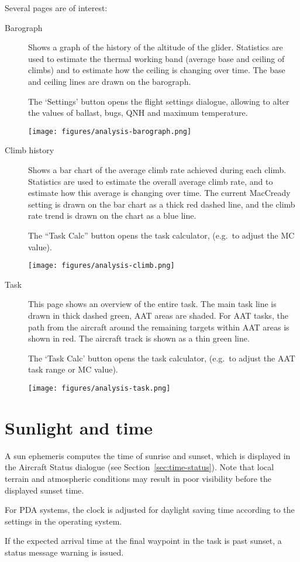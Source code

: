 Several pages are of interest:
\begin{description}
\item[Barograph]  Shows a graph of the history of the altitude of the glider.
  Statistics are used to estimate the thermal working band (average
  base and ceiling of climbs) and to estimate how the ceiling is
  changing over time.  The base and ceiling lines are drawn on the
  barograph.

  The `Settings' button opens the flight settings dialogue,
  allowing to alter the values of ballast, bugs, QNH and maximum temperature.

\begin{center}
\texttt{[image: figures/analysis-barograph.png]}
\end{center}

\item[Climb history]
  Shows a bar chart of the average climb rate achieved during each
  climb.  Statistics are used to estimate the overall average climb
  rate, and to estimate how this average is changing over time.  The
  current MacCready setting is drawn on the bar chart as a thick red
  dashed line, and the climb rate trend is drawn on the chart as a
  blue line.

  The ``Task Calc'' button opens the task calculator,
  (e.g.\ to adjust the MC value).

\begin{center}
\texttt{[image: figures/analysis-climb.png]}
\end{center}

\item[Task]
  This page shows an overview of the entire task.  The main task line
  is drawn in thick dashed green, AAT areas are shaded.  For AAT
  tasks, the path from the aircraft around the remaining targets within AAT
  areas is shown in red.  The aircraft track is shown as a thin green line.

  The `Task Calc' button opens the task calculator,
  (e.g.\ to adjust the AAT task range or MC value).

\begin{center}
\texttt{[image: figures/analysis-task.png]}
\end{center}

\end{description}

\section{Sunlight and time}

A sun ephemeris computes the time of sunrise and sunset, which is displayed in the
Aircraft Status dialogue (see Section~\ref{sec:time-status}).  Note that
local terrain and atmospheric conditions may result in poor visibility
before the displayed sunset time.

For PDA systems, the clock is adjusted for daylight saving time according
to the settings in the operating system.

If the expected arrival time at the final waypoint in the task is past
sunset, a status message warning is issued.
